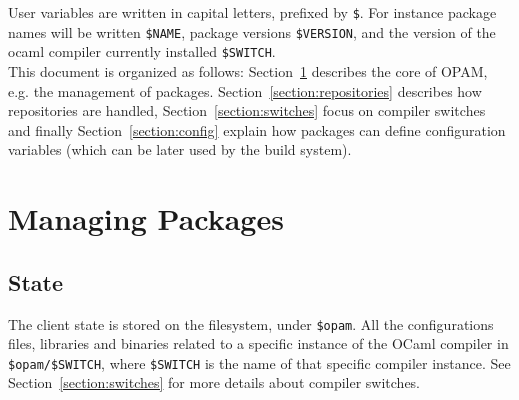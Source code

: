 \documentclass[a4paper,11pt]{article}
\begin{document}
User variables are written in capital letters, prefixed by \verb+$+. For
instance package names will be written \verb+$NAME+, package versions
\verb+$VERSION+, and the version of the ocaml compiler currently
installed \verb+$SWITCH+.\\

This document is organized as follows: Section~\ref{section:packages}
describes the core of OPAM, e.g. the management of
packages. Section~\ref{section:repositories} describes how
repositories are handled, Section~\ref{section:switches} focus on
compiler switches and finally Section~\ref{section:config} explain how
packages can define configuration variables (which can be later used
by the build system).

\section{Managing Packages}
\label{section:packages}

\subsection{State}

The client state is stored on the filesystem, under {\tt \$opam}.
All the configurations files, libraries and binaries related to a
specific instance of the OCaml compiler in \verb+$opam/$SWITCH+, where
\verb+$SWITCH+ is the name of that specific compiler instance. See
Section~\ref{section:switches} for more details about compiler
switches.
\end{document}
